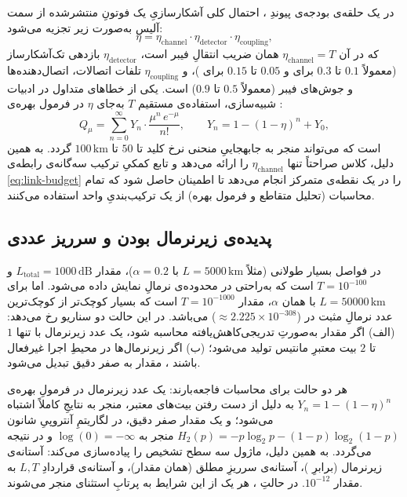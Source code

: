 در یک حلقه‌ی بودجه‌ی پیوندِ ، احتمال کلی آشکارسازیِ یک فوتونِ منتشرشده از سمت آلیس به‌صورت زیر تجزیه می‌شود:
\begin{equation}
	\eta = \eta_{\text{channel}} \cdot \eta_{\text{detector}} \cdot \eta_{\text{coupling}},
	\label{eq:link-budget}
\end{equation}
که در آن $\eta_{\text{channel}} = T$ همان ضریب انتقالِ فیبر است، $\eta_{\text{detector}}$ بازدهی تک‌آشکارساز (معمولاً $0.1$ تا $0.3$ برای  و $0.05$ تا $0.15$ برای )، و $\eta_{\text{coupling}}$ تلفات اتصالات، اتصال‌دهنده‌ها و جوش‌های فیبر (معمولاً $0.5$ تا $0.9$) است. یکی از خطاهای متداول در ادبیات شبیه‌سازی، استفاده‌ی مستقیم $T$ به‌جای $\eta$ در فرمول بهره‌ی :
\begin{equation}
	Q_\mu = \sum_{n=0}^{\infty} Y_n \cdot \frac{\mu^n\,e^{-\mu}}{n!}, \qquad Y_n = 1 - (1-\eta)^n + Y_0,
	\label{eq:decoy-gain}
\end{equation}
است که می‌تواند منجر به جابهجاییِ منحنی نرخ کلید تا $50$ تا $100\,\text{km}$ گردد. به همین دلیل، کلاس  صراحتاً تنها $\eta_{\text{channel}}$ را ارائه می‌دهد و تابع کمکیِ  ترکیب سه‌گانه‌ی رابطه‌ی \eqref{eq:link-budget} را در یک نقطه‌ی متمرکز انجام می‌دهد تا اطمینان حاصل شود که تمام محاسبات (تحلیل متقاطع  و فرمول بهره) از یک ترکیب‌بندیِ واحد استفاده می‌کنند.

\subsection{پدیده‌ی زیرنرمال بودن و سرریز عددی}

در فواصل بسیار طولانی (مثلاً $L = 5000\,\text{km}$ با $\alpha = 0.2$)، مقدار $L_{\text{total}} = 1000\,\text{dB}$ و $T = 10^{-100}$ است که به‌راحتی در محدوده‌ی نرمالِ  نمایش داده می‌شود. اما برای $L = 50000\,\text{km}$ با همان $\alpha$، مقدار $T = 10^{-1000}$ است که بسیار کوچک‌تر از کوچک‌ترین عدد نرمالِ مثبت در  ($\approx 2.225 \times 10^{-308}$) می‌باشد. در این حالت دو سناریو رخ می‌دهد: (الف) اگر مقدار به‌صورتِ تدریجی‌کاهش‌یافته  محاسبه شود، یک عدد زیرنرمال با تنها $1$ تا $2$ بیت معتبرِ مانتیس تولید می‌شود؛ (ب) اگر زیرنرمال‌ها در محیطِ اجرا غیرفعال باشند ، مقدار به صفر دقیق تبدیل می‌شود.

هر دو حالت برای محاسبات  فاجعه‌بارند: یک عدد زیرنرمال در فرمولِ بهره‌ی $Y_n = 1 - (1-\eta)^n$ به دلیل از دست رفتن بیت‌های معتبر، منجر به نتایجِ کاملاً اشتباه می‌شود؛ و یک مقدار صفر دقیق، در لگاریتمِ آنتروپیِ شانون $H_2(p) = -p\log_2 p - (1-p)\log_2(1-p)$ منجر به $\log(0) = -\infty$ و در نتیجه  می‌گردد. به همین دلیل، ماژول  سه سطح تشخیص را پیاده‌سازی می‌کند: آستانه‌ی زیرنرمال  (برابرِ )، آستانه‌ی سرریزِ مطلق  (همان مقدار)، و آستانه‌ی قراردادِ $L,T$ به مقدار $10^{-12}$. در حالتِ ، هر یک از این شرایط به پرتابِ استثنای  منجر می‌شوند.

